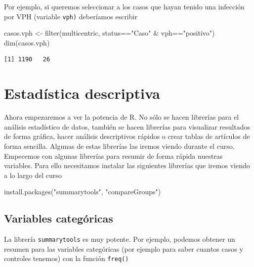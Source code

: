 \documentclass[
]{book}
\newenvironment{Shaded}{\begin{snugshade}}{\end{snugshade}}
\newcommand{\FunctionTok}[1]{\textcolor[rgb]{0.00,0.00,0.00}{#1}}
\newcommand{\NormalTok}[1]{#1}
\newcommand{\OtherTok}[1]{\textcolor[rgb]{0.56,0.35,0.01}{#1}}
\newcommand{\SpecialCharTok}[1]{\textcolor[rgb]{0.00,0.00,0.00}{#1}}
\newcommand{\StringTok}[1]{\textcolor[rgb]{0.31,0.60,0.02}{#1}}
\begin{document}
Por ejemplo, si queremos seleccionar a los casos que hayan tenido una infección por VPH (variable \texttt{vph)} deberíamos escribir

\begin{Shaded}
\begin{Highlighting}[]
\NormalTok{casos.vph }\OtherTok{\textless{}{-}} \FunctionTok{filter}\NormalTok{(multicentric, status}\SpecialCharTok{==}\StringTok{"Caso"} \SpecialCharTok{\&}\NormalTok{ vph}\SpecialCharTok{==}\StringTok{"positivo"}\NormalTok{)}
\FunctionTok{dim}\NormalTok{(casos.vph)}
\end{Highlighting}
\end{Shaded}

\begin{verbatim}
[1] 1190   26
\end{verbatim}

\hypertarget{estaduxedstica-descriptiva}{%
\chapter{Estadística descriptiva}\label{estaduxedstica-descriptiva}}

Ahora empezaremos a ver la potencia de R. No sólo se hacen librerías para el análisis estadístico de datos, también se hacen librerías para visualizar resultados de forma gráfica, hacer análisis descriptivos rápidos o crear tablas de artículos de forma sencilla. Algunas de estas librerías las iremos viendo durante el curso. Empecemos con algunas librerías para resumir de forma rápida nuestras variables. Para ello necesitamos instalar las siguientes librerías que iremos viendo a lo largo del curso

\begin{Shaded}
\begin{Highlighting}[]
\FunctionTok{install.packages}\NormalTok{(}\StringTok{"summarytools"}\NormalTok{, }\StringTok{"compareGroups"}\NormalTok{)}
\end{Highlighting}
\end{Shaded}

\hypertarget{variables-categuxf3ricas}{%
\section{Variables categóricas}\label{variables-categuxf3ricas}}

La librería \texttt{summarytools} es muy potente. Por ejemplo, podemos obtener un resumen para las variables categóricas (por ejemplo para saber cuantos casos y controles tenemos) con la función \texttt{freq()}
\end{document}

